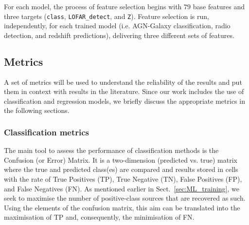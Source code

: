 \documentclass{aa}
\begin{document}

For each model, the process of feature selection begins with $79$ base features and three targets (\verb|class|, \verb|LOFAR_detect|, and \verb|Z|). Feature selection is run, independently, for each trained model (i.e. AGN-Galaxy classification, radio detection, and redshift predictions), delivering three different sets of features.

\subsection{Metrics}\label{sec:metrics}

A set of metrics will be used to understand the reliability of the results and put them in context with results in the literature. 
Since our work includes the use of classification and regression models, we briefly discuss the appropriate metrics in the following sections.

\subsubsection{Classification metrics}\label{sec:metrics_classfication}

The main tool to assess the performance of classification methods is the Confusion (or Error) Matrix. It is a two-dimension (predicted vs. true) matrix where the true and predicted class(es) are compared and results stored in cells with the rate of True Positives (TP), True Negative (TN), False Positives (FP), and False Negatives (FN). As mentioned earlier in Sect.~\ref{sec:ML_training}, we seek to maximise the number of positive-class sources that are recovered as such. Using the elements of the confusion matrix, this aim can be translated into the maximisation of TP and, consequently, the minimisation of FN.
\end{document}
